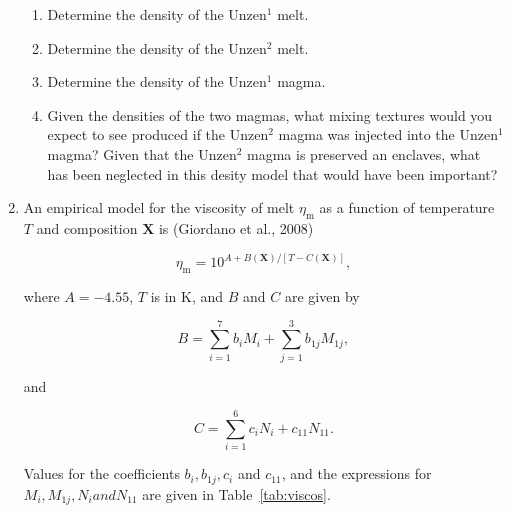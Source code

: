 \documentclass[]{book}
\theoremstyle{definition}
\begin{document}
\begin{enumerate}
  \begin{enumerate}
  \item Determine the density of the Unzen$^{1}$ melt.
  \item Determine the density of the Unzen$^{2}$ melt.
  \item Determine the density of the Unzen$^{1}$ magma.
  \item Given the densities of the two magmas, what mixing textures would you expect to see produced if the Unzen$^{2}$ magma was injected into the Unzen$^{1}$ magma? Given that the Unzen$^{2}$ magma is preserved an enclaves, what has been neglected in this desity model that would have been important?
  \end{enumerate}


  \item An empirical model for the viscosity of melt $\eta_{\text{m}}$ as a function of temperature $T$ and composition $\mathbf{X}$ is (Giordano et al., 2008)
  
  \begin{equation}
    \label{equ:Giordano}
    \eta_{\text{m}} = 10 ^{A + B(\mathbf{X})/[T - C(\mathbf{X})]},
  \end{equation}

  where $A = -4.55$, $T$ is in K, and $B$ and $C$ are given by

  \begin{equation}
    \label{equ:Giordano_B}
    B = \sum_{i = 1}^{7} b_{i} M_{i} + \sum_{j = 1}^{3} b_{1j} M_{1j},
  \end{equation}

  and
  
  \begin{equation}
    \label{equ:Giordano_C}
    C = \sum_{i = 1}^{6} c_{i} N_{i} + c_{11} N_{11}.
  \end{equation}

  Values for the coefficients $b_{i}, b_{1j}, c_{i}$ and $c_{11}$, and the expressions for $M_{i}, M_{1j}, N_{i} and N_{11}$ are given in Table~\ref{tab:viscos}.


\end{enumerate}
\end{document}
